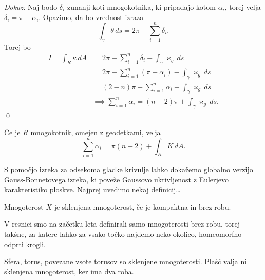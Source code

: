 \noindent
{\em Dokaz:\/}
Naj bodo $\delta_i$ zunanji koti mnogokotnika, ki pripadajo kotom $\alpha_i$, torej velja $\delta_i = \pi - \alpha_i$. Opazimo, da bo vrednost izraza \begin{equation*}
    \int_{\gamma} \dot{\theta}  \, ds = 2 \pi - \sum_{i = 1}^{n} \delta_i.
\end{equation*}  
Torej bo \begin{align*}
    I = \int_{R} \kappa  \, dA &= 2 \pi  - \sum_{i = 1}^{n} \delta_i - \int_{\gamma} \varkappa_g  \, ds   \\
     &= 2 \pi- \sum_{i =1}^{n} (\pi - \alpha_i) - \int_{\gamma} \varkappa_g \, ds \\
    &= (2 - n)\pi + \sum_{i = 1}^{n} \alpha_i - \int_{\gamma} \varkappa_g \, ds \\
    &\implies \sum_{i = 1}^{n} \alpha_i = (n - 2)\pi + \int_{\gamma} \varkappa_g \, ds.
\end{align*}  
\qed
\begin{posledica}
    \label{psl_posledica_globalnega_GB_izreka}
    Če je $R$ mnogokotnik, omejen z  geodetkami, velja \begin{equation*}
        \sum_{i=1}^{n} \alpha_i = \pi(n-2)  + \int_{R} K \, dA. 
    \end{equation*}  
      
    \end{posledica}

S pomočjo izreka za odsekoma gladke krivulje lahko dokažemo globalno verzijo Gauss-Bonnetovega izreka, ki poveže Gaussovo ukrivljenost z Eulerjevo karakteristiko ploskve. Najprej uvedimo nekaj definicij\ldots

\begin{definicija}
\label{def_sklenjena_mnogoterost}
Mnogoterost $X$ je sklenjena mnogoterost, če je kompaktna in brez robu.
\end{definicija}

\begin{opomba}
V resnici smo na začetku leta definirali samo mnogoterosti brez robu, torej takšne, za katere lahko za vsako točko najdemo neko okolico, homeomorfno odprti krogli.
\end{opomba}

\begin{primer}
Sfera, torus, povezane vsote torusov so sklenjene mnogoterosti. Plašč valja ni sklenjena mnogoterost, ker ima dva roba. 
\end{primer}

